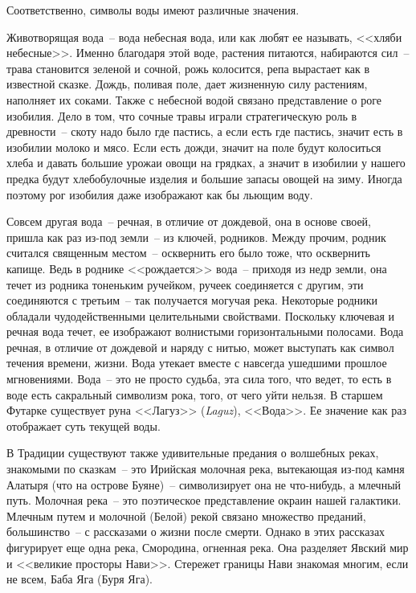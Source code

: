 \documentclass[pscyr,chapters]{hedwork}
\begin{document}
  Соответственно, символы воды имеют различные значения.

  Животворящая вода~-- вода небесная вода, или как любят ее называть, <<хляби
  небесные>>. Именно
  благодаря этой воде, растения питаются, набираются сил~-- трава становится
  зеленой и сочной, рожь колосится, репа вырастает как в известной сказке.
  Дождь, поливая поле, дает жизненную силу растениям, наполняет их соками. Также
  с небесной водой связано представление о роге изобилия. Дело в том, что сочные
  травы играли стратегическую роль в древности~-- скоту надо было где пастись, а
  если есть где пастись, значит есть в изобилии молоко и мясо. Если есть дожди,
  значит на поле будут колоситься хлеба и давать большие урожаи овощи на
  грядках, а значит в изобилии у нашего предка будут хлебобулочные изделия и
  большие запасы овощей на зиму. Иногда поэтому рог изобилия даже изображают как
  бы льющим воду.

  Совсем другая вода~-- речная, в отличие от дождевой, она в основе своей,
  пришла как раз из-под земли~-- из ключей, родников. Между прочим, родник
  считался священным местом~-- осквернить его было тоже, что осквернить капище.
  Ведь в роднике <<рождается>> вода~-- приходя из недр земли, она течет из
  родника тоненьким ручейком, ручеек соединяется с другим, эти соединяются с
  третьим~-- так получается могучая река. Некоторые родники обладали
  чудодейственными целительными свойствами. Поскольку ключевая и речная вода
  течет, ее изображают волнистыми горизонтальными полосами. Вода речная, в
  отличие от дождевой и наряду с нитью, может выступать как символ течения
  времени, жизни. Вода утекает вместе с навсегда ушедшими прошлое мгновениями.
  Вода~-- это не просто судьба, эта сила того, что
  ведет, то есть в воде есть сакральный символизм рока, того, от чего уйти
  нельзя. В старшем Футарке существует руна <<Лагуз>> (\emph{Laguz}), <<Вода>>.
  Ее значение как раз отображает суть текущей воды.

  В Традиции существуют также удивительные предания о волшебных реках, знакомыми
  по сказкам~-- это Ирийская молочная река, вытекающая
  из-под камня Алатыря (что на острове Буяне)~-- символизирует она не
  что-нибудь, а млечный путь. Молочная река~-- это поэтическое представление
  окраин нашей галактики. Млечным путем и молочной (Белой) рекой связано
  множество преданий, большинство~-- с рассказами о жизни после смерти. Однако в
  этих рассказах фигурирует еще одна река, Смородина, огненная река. Она
  разделяет Явский мир и <<великие просторы Нави>>. Стережет границы Нави
  знакомая многим, если не всем, Баба Яга (Буря Яга).
\end{document}
